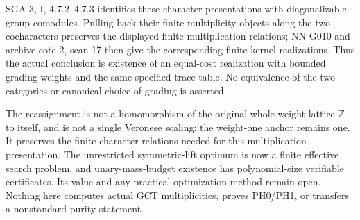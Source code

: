 SGA 3, I, 4.7.2--4.7.3 identifies these character
presentations with diagonalizable-group comodules.
Pulling back their finite multiplicity objects along
the two cocharacters preserves the displayed finite
multiplication relations; NN-G010 and archive cote 2,
scan 17 then give the corresponding finite-kernel
realizations. Thus the actual conclusion is existence
of an equal-cost realization with bounded grading
weights and the same specified trace table. No equivalence
of the two categories or canonical choice of grading
is asserted.

The reassignment is not a homomorphism of the original
whole weight lattice $\mathbb Z$ to itself, and is not
a single Veronese scaling: the weight-one anchor remains
one. It preserves the finite character relations needed
for this multiplication presentation. The unrestricted
symmetric-lift optimum is now a finite effective search
problem, and unary-mass-budget existence has polynomial-size
verifiable certificates. Its value and any practical
optimization method remain open. Nothing here computes actual GCT multiplicities,
proves PH0/PH1, or transfers a nonstandard purity statement.
